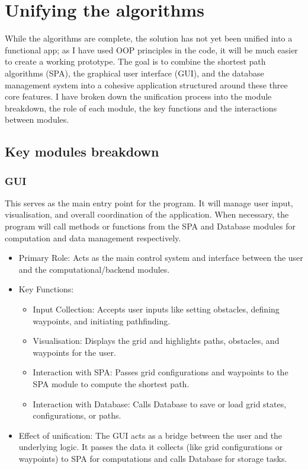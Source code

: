 \section{Unifying the algorithms}

While the algorithms are complete, the solution has not yet been unified into a functional app; as I have used OOP principles in the code, it will be much easier to create a working prototype. The goal is to combine the shortest path algorithms (SPA), the graphical user interface (GUI), and the database management system into a cohesive application structured around these three core features. I have broken down the unification process into the module breakdown, the role of each module, the key functions and the interactions between modules.

\newpage

\subsection{Key modules breakdown}

\subsubsection{GUI}
    
This serves as the main entry point for the program. It will manage user input, visualisation, and overall coordination of the application. When necessary, the program will call methods or functions from the SPA and Database modules for computation and data management respectively.

\begin{itemize}
    \item Primary Role: Acts as the main control system and interface between the user and the computational/backend modules.
    \item Key Functions:
        \begin{itemize}
            \item Input Collection: Accepts user inputs like setting obstacles, defining waypoints, and initiating pathfinding.
            \item Visualisation: Displays the grid and highlights paths, obstacles, and waypoints for the user.
            \item Interaction with SPA: Passes grid configurations and waypoints to the SPA module to compute the shortest path.
            \item Interaction with Database: Calls Database to save or load grid states, configurations, or paths.
        \end{itemize}
    \item Effect of unification: \newline
    The GUI acts as a bridge between the user and the underlying logic. It passes the data it collects (like grid configurations or waypoints) to SPA for computations and calls Database for storage tasks.
\end{itemize}



